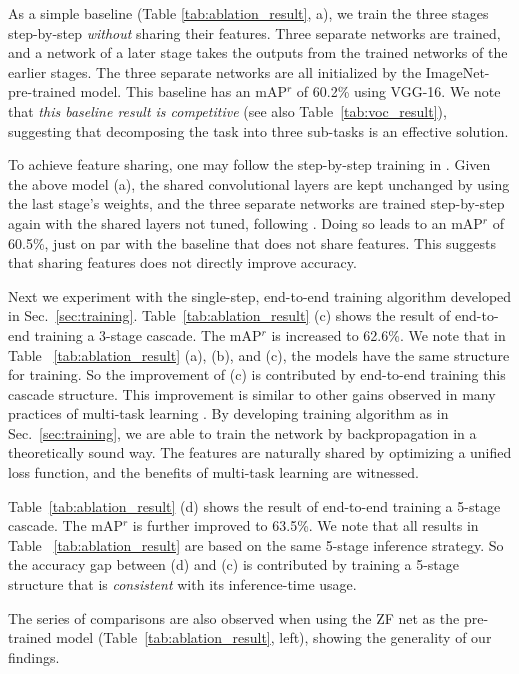 \documentclass[10pt,twocolumn,letterpaper]{article}
\begin{document}
As a simple baseline (Table \ref{tab:ablation_result}, a), we train the three stages step-by-step \emph{without} sharing their features. Three separate networks are trained, and a network of a later stage takes the outputs from the trained networks of the earlier stages. The three separate networks are all initialized by the ImageNet-pre-trained model. This baseline has an mAP$^r$ of 60.2\% using VGG-16. We note that \emph{this baseline result is competitive} (see also Table~\ref{tab:voc_result}), suggesting that decomposing the task into three sub-tasks is an effective solution.

To achieve feature sharing, one may follow the step-by-step training in \cite{Ren2015}. Given the above model (a), the shared convolutional layers are kept unchanged by using the last stage's weights, and the three separate networks are trained step-by-step again with the shared layers not tuned, following \cite{Ren2015}. Doing so leads to an mAP$^r$ of 60.5\%, just on par with the baseline that does not share features. This suggests that sharing features does not directly improve accuracy.

Next we experiment with the single-step, end-to-end training algorithm developed in Sec.~\ref{sec:training}. Table~\ref{tab:ablation_result} (c) shows the result of end-to-end training a 3-stage cascade. The mAP$^r$ is increased to 62.6\%. We note that in Table ~\ref{tab:ablation_result} (a), (b), and (c), the models have the same structure for training. So the improvement of (c) is contributed by end-to-end training this cascade structure.
This improvement is similar to other gains observed in many practices of multi-task learning \cite{Caruana1997}.
By developing training algorithm as in Sec.~\ref{sec:training}, we are able to train the network by backpropagation in a theoretically sound way. The features are naturally shared by optimizing a unified loss function, and the benefits of multi-task learning are witnessed.

Table~\ref{tab:ablation_result} (d) shows the result of end-to-end training a 5-stage cascade. The mAP$^r$ is further improved to 63.5\%. We note that all results in Table ~\ref{tab:ablation_result} are based on the same 5-stage inference strategy. So the accuracy gap between (d) and (c) is contributed by training a 5-stage structure that is \emph{consistent} with its inference-time usage.

The series of comparisons are also observed when using the ZF net as the pre-trained model (Table~\ref{tab:ablation_result}, left), showing the generality of our findings.
\end{document}
